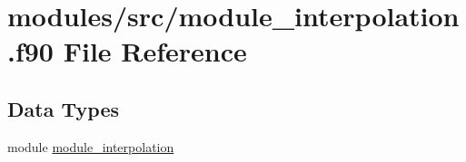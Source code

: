 \hypertarget{module__interpolation_8f90}{
\section{modules/src/module\-\_\-interpolation.f90 \-File \-Reference}
\label{module__interpolation_8f90}
}
\subsection*{\-Data \-Types}
\begin{DoxyCompactItemize}
\item 
module \hyperlink{classmodule__interpolation}{module\-\_\-interpolation}
\end{DoxyCompactItemize}
